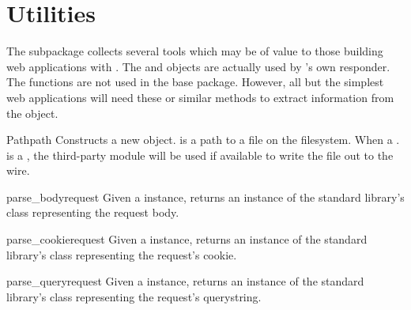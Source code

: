 \section{Utilities \label{utils}}

The  subpackage collects several tools which may be of value
to those building web applications with . The  and
 objects are actually used by 's own
 responder. The  functions are not used in the
base package. However, all but the simplest web applications will need these or
similar methods to extract information from the  object.


\begin{classdesc}{Path}{path}
Constructs a new  object.  is a path to a file on the
filesystem. When a . is a , the
third-party
module will be used if available to write the file out to the wire.
\end{classdesc}



\begin{funcdesc}{parse_body}{request}
Given a  instance, returns an instance of the standard library's
 class
representing the request body.
\end{funcdesc}

\begin{funcdesc}{parse_cookie}{request}
Given a  instance, returns an instance of the standard library's
 class
representing the request's cookie.
\end{funcdesc}

\begin{funcdesc}{parse_query}{request}
Given a  instance, returns an instance of the standard library's
 class
representing the request's querystring.
\end{funcdesc}



